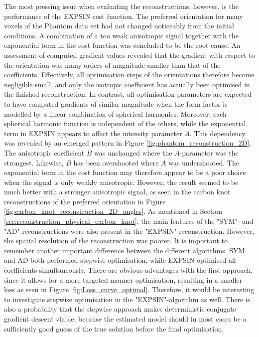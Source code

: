 The most pressing issue when evaluating the reconstructions, however, is the performance of the EXPSIN cost function.
The preferred orientation for many voxels of the Phantom data set had not changed noticeably from the initial conditions.
A combination of a too weak anisotropic signal together with the exponential term in the cost function was concluded to be the root cause.
An assessment of computed gradient values revealed that the gradient with respect to the orientation was many orders of magnitude smaller than that of the coefficients.
Effectively, all optimisation steps of the orientations therefore become negligible small, and only the isotropic coefficient has actually been optimised in the finished reconstruction.
In contrast, all optimisation parameters are expected to have computed gradients of similar magnitude when the form factor is modelled by a linear combination of spherical harmonics.
Moreover, each spherical harmonic function is independent of the others, while the exponential term in EXPSIN appears to affect the intensity parameter $A$.
This dependency was revealed by an emerged pattern in Figure \ref{fig:phantom_reconstruction_2D}. The anisotropic coefficient $B$ was unchanged where the $A$-parameter was the strongest.
Likewise, $B$ has been overshooted where $A$ was undershooted.
The exponential term in the cost function may therefore appear to be a poor choice when the signal is only weakly anisotropic.
However, the result seemed to be much better with a stronger anisotropic signal, as seen in the carbon knot reconstructions of the preferred orientation in Figure \ref{fig:carbon_knot_reconstruction_2D_angles}.
As mentioned in Section \ref{sec:reconstruction_physical_carbon_knot},
the main features of the "SYM"- and "AD"-reconstructions were also present in the "EXPSIN"-reconstruction.
However, the spatial resolution of the reconstruction was poorer.
It is important to remember another important difference between the different algorithms.
SYM and AD both performed stepwise optimisation, while EXPSIN optimised all coefficients simultaneously.
There are obvious advantages with the first approach, since it allows for a more targeted manner optimisation, resulting in a smaller loss as seen in Figure \ref{fig:Loss_curve_optimal}.
Therefore, it would be interesting to investigate stepwise optimisation in the "EXPSIN"-algorithm as well.
There is also a probability that the stepwise approach makes deterministic conjugate gradient descent viable,
because the estimated model should in most cases be a sufficiently good guess of the true solution before the final optimisation.


